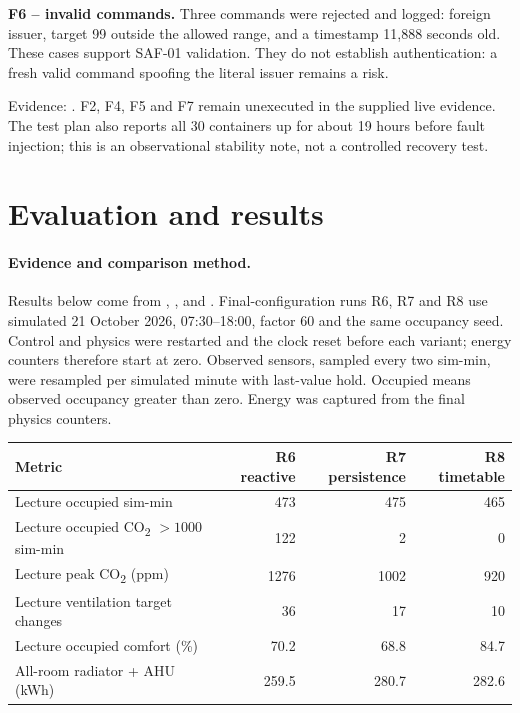 \documentclass[11pt,a4paper]{article}
\begin{document}
\textbf{F6 -- invalid commands.} Three commands were rejected and logged: foreign issuer, target 99 outside the allowed range, and a timestamp 11,888 seconds old. These cases support SAF-01 validation. They do not establish authentication: a fresh valid command spoofing the literal issuer remains a risk.

Evidence: \protect{}. F2, F4, F5 and F7 remain unexecuted in the supplied live evidence. The test plan also reports all 30 containers up for about 19 hours before fault injection; this is an observational stability note, not a controlled recovery test.

\section{Evaluation and results}
\label{sec:results}
\paragraph{Evidence and comparison method.}
Results below come from \protect{}, \protect{}, \protect{} and \protect{}. Final-configuration runs R6, R7 and R8 use simulated 21 October 2026, 07:30--18:00, factor 60 and the same occupancy seed. Control and physics were restarted and the clock reset before each variant; energy counters therefore start at zero. Observed sensors, sampled every two sim-min, were resampled per simulated minute with last-value hold. Occupied means observed occupancy greater than zero. Energy was captured from the final physics counters.

\noindent\begin{tabularx}{\linewidth}{Xrrr}\toprule Metric & R6 reactive & R7 persistence & R8 timetable\\\midrule
Lecture occupied sim-min & 473 & 475 & 465\\
Lecture occupied CO\textsubscript{2} $>1000$ sim-min & 122 & 2 & 0\\
Lecture peak CO\textsubscript{2} (ppm) & 1276 & 1002 & 920\\
Lecture ventilation target changes & 36 & 17 & 10\\
Lecture occupied comfort (\%) & 70.2 & 68.8 & 84.7\\
All-room radiator + AHU (kWh) & 259.5 & 280.7 & 282.6\\\bottomrule\end{tabularx}
\end{document}
